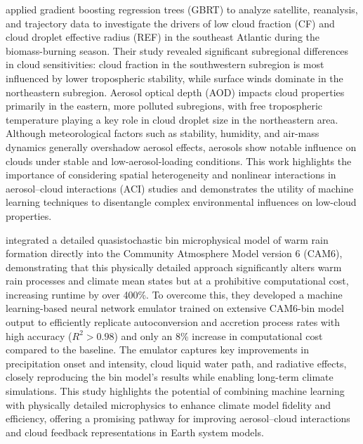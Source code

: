 \documentclass[11pt]{article}
\begin{document}
\citet{fuchs2018building} applied gradient boosting regression trees (GBRT) to analyze satellite, reanalysis, and trajectory data to investigate the drivers of low cloud fraction (CF) and cloud droplet effective radius (REF) in the southeast Atlantic during the biomass-burning season. Their study revealed significant subregional differences in cloud sensitivities: cloud fraction in the southwestern subregion is most influenced by lower tropospheric stability, while surface winds dominate in the northeastern subregion. Aerosol optical depth (AOD) impacts cloud properties primarily in the eastern, more polluted subregions, with free tropospheric temperature playing a key role in cloud droplet size in the northeastern area. Although meteorological factors such as stability, humidity, and air-mass dynamics generally overshadow aerosol effects, aerosols show notable influence on clouds under stable and low-aerosol-loading conditions. This work highlights the importance of considering spatial heterogeneity and nonlinear interactions in aerosol–cloud interactions (ACI) studies and demonstrates the utility of machine learning techniques to disentangle complex environmental influences on low-cloud properties.

\citet{gettelman2021machine} integrated a detailed quasistochastic bin microphysical model of warm rain formation directly into the Community Atmosphere Model version 6 (CAM6), demonstrating that this physically detailed approach significantly alters warm rain processes and climate mean states but at a prohibitive computational cost, increasing runtime by over 400\%. To overcome this, they developed a machine learning-based neural network emulator trained on extensive CAM6-bin model output to efficiently replicate autoconversion and accretion process rates with high accuracy (\(R^2 > 0.98\)) and only an 8\% increase in computational cost compared to the baseline. The emulator captures key improvements in precipitation onset and intensity, cloud liquid water path, and radiative effects, closely reproducing the bin model’s results while enabling long-term climate simulations. This study highlights the potential of combining machine learning with physically detailed microphysics to enhance climate model fidelity and efficiency, offering a promising pathway for improving aerosol–cloud interactions and cloud feedback representations in Earth system models.
\end{document}
